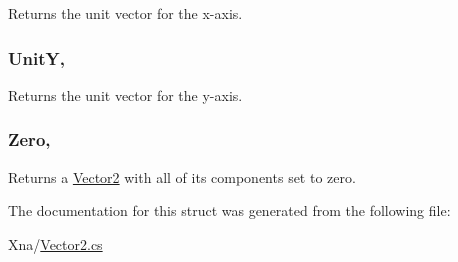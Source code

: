 Returns the unit vector for the x-\/axis.

\hypertarget{structMicrosoft_1_1Xna_1_1Framework_1_1Vector2_ae7d95a35bbd1615a2ad992b673218a10}{}
\subsubsection[{Unit\+Y}]{ Unit\+Y\hspace{0.3cm}{\ttfamily [static]}, {\ttfamily [get]}}\label{structMicrosoft_1_1Xna_1_1Framework_1_1Vector2_ae7d95a35bbd1615a2ad992b673218a10}


Returns the unit vector for the y-\/axis.

\hypertarget{structMicrosoft_1_1Xna_1_1Framework_1_1Vector2_a9dcabe40c6579fd0521317ba8d6663f3}{}
\subsubsection[{Zero}]{ Zero\hspace{0.3cm}{\ttfamily [static]}, {\ttfamily [get]}}\label{structMicrosoft_1_1Xna_1_1Framework_1_1Vector2_a9dcabe40c6579fd0521317ba8d6663f3}


Returns a \hyperlink{structMicrosoft_1_1Xna_1_1Framework_1_1Vector2}{Vector2} with all of its components set to zero.



The documentation for this struct was generated from the following file\+:\begin{DoxyCompactItemize}
\item 
Xna/\hyperlink{Vector2_8cs}{Vector2.\+cs}\end{DoxyCompactItemize}
